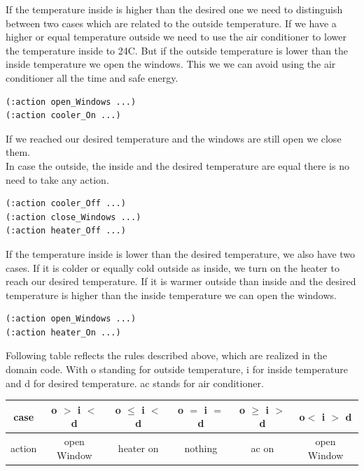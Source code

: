 \documentclass[runningheads]{llncs}
\begin{document}
If the temperature inside is higher than the desired one we need to distinguish between two cases which are related to the outside temperature. If we have a higher or equal temperature outside we need to use the air conditioner to lower the temperature inside to 24C. But if the outside temperature is lower than the inside temperature we open the windows. This we we can avoid using the air conditioner all the time and safe energy.
\begin{lstlisting}
(:action open_Windows ...)
(:action cooler_On ...)
\end{lstlisting}
If we reached our desired temperature and the windows are still open we close them. \\
In case the outside, the inside and the desired temperature are equal there is no need to take any action.
\begin{lstlisting}
(:action cooler_Off ...)
(:action close_Windows ...)
(:action heater_Off ...)
\end{lstlisting}
If the temperature inside is lower than the desired temperature, we also have two cases. If it is colder or equally cold outside as inside, we turn on the heater to reach our desired temperature. If it is warmer outside than inside and the desired temperature is higher than the inside temperature we can open the windows.
\begin{lstlisting}
(:action open_Windows ...)
(:action heater_On ...)
\end{lstlisting}
Following table reflects the rules described above, which are realized in the domain code. With o standing for outside temperature, i for inside temperature and d for desired temperature. ac stands for air conditioner.\\

\begin{tabular}{|c |c |c| c|c|c|}
\hline
case &o $>$ i $<$ d & o $\leq$ i $<$ d & o $=$ i $=$ d & o $\geq$ i $>$ d & o$ <$ i $>$ d \\
\hline
action &open Window & heater on & nothing& ac on& open Window\\
\hline 
\end{tabular}\\
\end{document}

